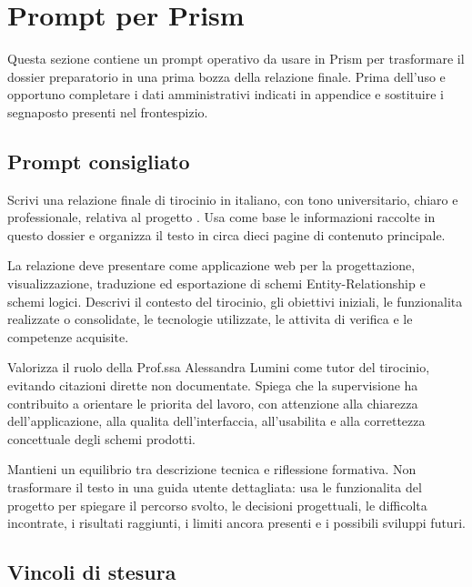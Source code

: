 
\chapter{Prompt per Prism}\label{ch:prompt-prism}

Questa sezione contiene un prompt operativo da usare in Prism per trasformare il dossier preparatorio in una prima bozza della relazione finale. Prima dell'uso e opportuno completare i dati amministrativi indicati in appendice e sostituire i segnaposto presenti nel frontespizio.

\section{Prompt consigliato}

Scrivi una relazione finale di tirocinio in italiano, con tono universitario, chiaro e professionale, relativa al progetto \builder. Usa come base le informazioni raccolte in questo dossier e organizza il testo in circa dieci pagine di contenuto principale.

La relazione deve presentare \builder{} come applicazione web per la progettazione, visualizzazione, traduzione ed esportazione di schemi Entity-Relationship e schemi logici. Descrivi il contesto del tirocinio, gli obiettivi iniziali, le funzionalita realizzate o consolidate, le tecnologie utilizzate, le attivita di verifica e le competenze acquisite.

Valorizza il ruolo della Prof.ssa Alessandra Lumini come tutor del tirocinio, evitando citazioni dirette non documentate. Spiega che la supervisione ha contribuito a orientare le priorita del lavoro, con attenzione alla chiarezza dell'applicazione, alla qualita dell'interfaccia, all'usabilita e alla correttezza concettuale degli schemi prodotti.

Mantieni un equilibrio tra descrizione tecnica e riflessione formativa. Non trasformare il testo in una guida utente dettagliata: usa le funzionalita del progetto per spiegare il percorso svolto, le decisioni progettuali, le difficolta incontrate, i risultati raggiunti, i limiti ancora presenti e i possibili sviluppi futuri.

\section{Vincoli di stesura}

